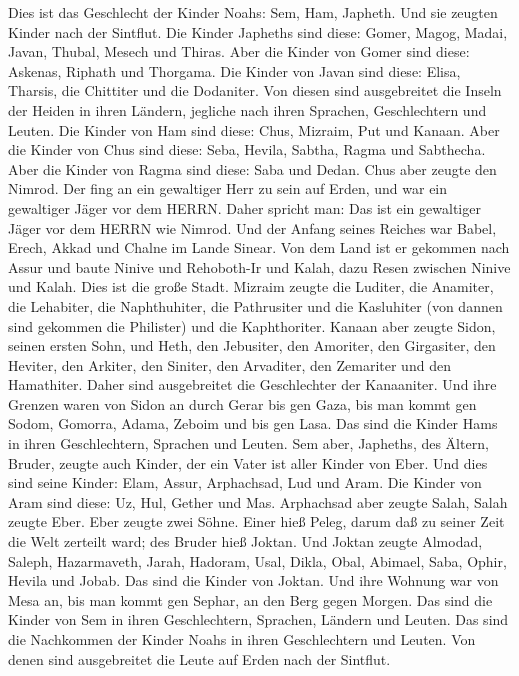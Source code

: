  Dies ist das Geschlecht der Kinder Noahs: Sem, Ham,
Japheth. Und sie zeugten Kinder nach der Sintflut.  Die
Kinder Japheths sind diese: Gomer, Magog, Madai, Javan, Thubal, Mesech
und Thiras.  Aber die Kinder von Gomer sind diese: Askenas,
Riphath und Thorgama.  Die Kinder von Javan sind diese:
Elisa, Tharsis, die Chittiter und die Dodaniter.  Von diesen
sind ausgebreitet die Inseln der Heiden in ihren Ländern, jegliche nach
ihren Sprachen, Geschlechtern und Leuten.  Die Kinder von
Ham sind diese: Chus, Mizraim, Put und Kanaan.  Aber die
Kinder von Chus sind diese: Seba, Hevila, Sabtha, Ragma und Sabthecha.
Aber die Kinder von Ragma sind diese: Saba und Dedan.  Chus
aber zeugte den Nimrod. Der fing an ein gewaltiger Herr zu sein auf
Erden,  und war ein gewaltiger Jäger vor dem HERRN. Daher
spricht man: Das ist ein gewaltiger Jäger vor dem HERRN wie Nimrod.
 Und der Anfang seines Reiches war Babel, Erech, Akkad und
Chalne im Lande Sinear.  Von dem Land ist er gekommen nach
Assur und baute Ninive und Rehoboth-Ir und Kalah,  dazu
Resen zwischen Ninive und Kalah. Dies ist die große Stadt. 
Mizraim zeugte die Luditer, die Anamiter, die Lehabiter, die
Naphthuhiter,  die Pathrusiter und die Kasluhiter (von
dannen sind gekommen die Philister) und die Kaphthoriter. 
Kanaan aber zeugte Sidon, seinen ersten Sohn, und Heth, 
den Jebusiter, den Amoriter, den Girgasiter,  den Heviter,
den Arkiter, den Siniter,  den Arvaditer, den Zemariter und
den Hamathiter. Daher sind ausgebreitet die Geschlechter der Kanaaniter.
 Und ihre Grenzen waren von Sidon an durch Gerar bis gen
Gaza, bis man kommt gen Sodom, Gomorra, Adama, Zeboim und bis gen Lasa.
 Das sind die Kinder Hams in ihren Geschlechtern, Sprachen
und Leuten.  Sem aber, Japheths, des Ältern, Bruder, zeugte
auch Kinder, der ein Vater ist aller Kinder von Eber.  Und
dies sind seine Kinder: Elam, Assur, Arphachsad, Lud und Aram.
 Die Kinder von Aram sind diese: Uz, Hul, Gether und Mas.
 Arphachsad aber zeugte Salah, Salah zeugte Eber.
 Eber zeugte zwei Söhne. Einer hieß Peleg, darum daß zu
seiner Zeit die Welt zerteilt ward; des Bruder hieß Joktan.
 Und Joktan zeugte Almodad, Saleph, Hazarmaveth, Jarah,
 Hadoram, Usal, Dikla,  Obal, Abimael, Saba,
 Ophir, Hevila und Jobab. Das sind die Kinder von Joktan.
 Und ihre Wohnung war von Mesa an, bis man kommt gen
Sephar, an den Berg gegen Morgen.  Das sind die Kinder von
Sem in ihren Geschlechtern, Sprachen, Ländern und Leuten. 
Das sind die Nachkommen der Kinder Noahs in ihren Geschlechtern und
Leuten. Von denen sind ausgebreitet die Leute auf Erden nach der
Sintflut.

